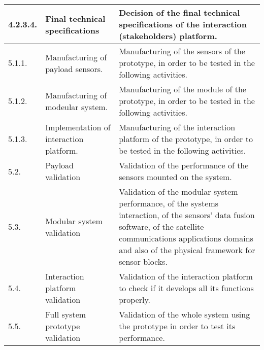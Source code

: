 \begin{longtable}[H]{l >{\raggedright\arraybackslash}p{4cm} p{8cm}}
	\midrule
	
	4.2.3.4. & Final technical specifications & Decision of the final technical specifications of the interaction (stakeholders) platform.\vspace{0.2cm} \\

	
	\midrule

	5.1.1. & Manufacturing of payload sensors. & Manufacturing of the sensors of the prototype, in order to be tested in the following activities.\vspace{0.2cm} \\
	
	\midrule
	
	5.1.2. & Manufacturing of modeular system. & Manufacturing of the module of the prototype, in order to be tested in the following activities.\vspace{0.2cm} \\
	
	\midrule
	
	5.1.3. & Implementation of interaction platform. & Manufacturing of the interaction platform of the prototype, in order to be tested in the following activities.\vspace{0.2cm} \\
	
	\midrule
	
	5.2. & Payload validation & Validation of the performance of the sensors mounted on the system.\vspace{0.2cm} \\
	
	\midrule
	
	5.3. & Modular system validation & Validation of the modular system performance, of the systems interaction, of the sensors' data fusion software, of the satellite communications applications domains and also of the physical framework for sensor blocks.\vspace{0.2cm} \\
	
	\midrule
	
	5.4. & Interaction platform validation & Validation of the interaction platform to check if it develops all its functions properly.\vspace{0.2cm} \\
	
	\midrule
	
	5.5. & Full system prototype validation & Validation of the whole system using the prototype in order to test its performance.\vspace{0.2cm} \\
	

\end{longtable}

